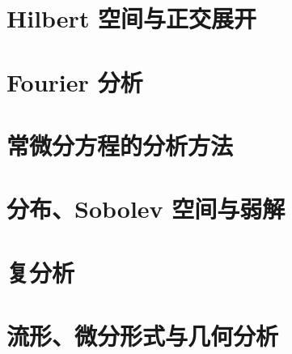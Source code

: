 \documentclass[UTF8,zihao=-4,openany,fontset=fandol]{ctexbook}
\begin{document}
\part{Hilbert 空间与正交展开}



\part{Fourier 分析}





\part{常微分方程的分析方法}



\part{分布、Sobolev 空间与弱解}



\part{复分析}









\part{流形、微分形式与几何分析}






\end{document}
